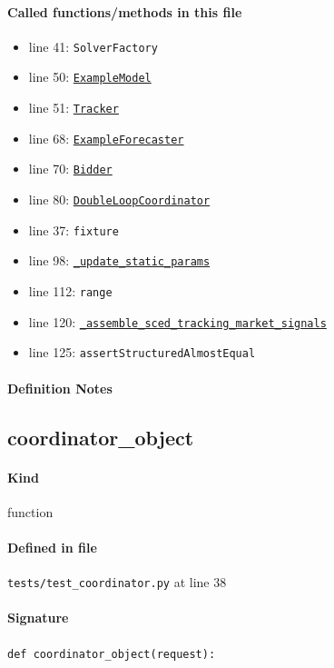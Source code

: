 \documentclass[11pt]{report}
\begin{document}
\paragraph{Called functions/methods in this file}
\begin{itemize}[leftmargin=*]
  \item line 41: \texttt{SolverFactory}
  \item line 50: \hyperref[def:tests-util.py:ExampleModel:L25]{\texttt{ExampleModel}}
  \item line 51: \hyperref[def:tracker.py:Tracker:L19]{\texttt{Tracker}}
  \item line 68: \hyperref[def:tests-util.py:ExampleForecaster:L259]{\texttt{ExampleForecaster}}
  \item line 70: \hyperref[def:bidder.py:Bidder:L1000]{\texttt{Bidder}}
  \item line 80: \hyperref[def:coordinator.py:DoubleLoopCoordinator:L30]{\texttt{DoubleLoopCoordinator}}
  \item line 37: \texttt{fixture}
  \item line 98: \hyperref[def:coordinator.py:DoubleLoopCoordinator._update_static_params:L399]{\texttt{\_update\_static\_params}}
  \item line 112: \texttt{range}
  \item line 120: \hyperref[def:coordinator.py:DoubleLoopCoordinator._assemble_sced_tracking_market_signals:L683]{\texttt{\_assemble\_sced\_tracking\_market\_signals}}
  \item line 125: \texttt{assertStructuredAlmostEqual}
\end{itemize}
\paragraph{Definition Notes}
\subsection{coordinator\_object}
\label{def:tests-test_coordinator.py:coordinator_object:L38}
\paragraph{Kind} function
\paragraph{Defined in file} \texttt{tests/test\_coordinator.py} at line 38
\paragraph{Signature} \texttt{def coordinator\_object(request):}
\end{document}
